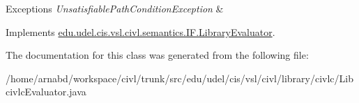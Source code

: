 \begin{DoxyExceptions}{Exceptions}
{\em Unsatisfiable\+Path\+Condition\+Exception} & \\
\hline
\end{DoxyExceptions}


Implements \hyperlink{interfaceedu_1_1udel_1_1cis_1_1vsl_1_1civl_1_1semantics_1_1IF_1_1LibraryEvaluator_a36d4bbd355cb9544feaaf0979280c70b}{edu.\+udel.\+cis.\+vsl.\+civl.\+semantics.\+I\+F.\+Library\+Evaluator}.



The documentation for this class was generated from the following file\+:\begin{DoxyCompactItemize}
\item 
/home/arnabd/workspace/civl/trunk/src/edu/udel/cis/vsl/civl/library/civlc/Libcivlc\+Evaluator.\+java\end{DoxyCompactItemize}
